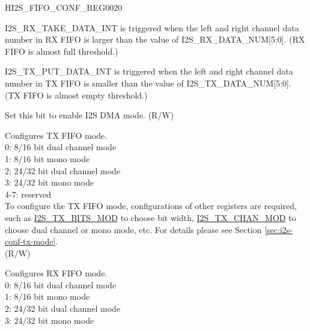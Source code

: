 \begin{register}{H}{I2S\_FIFO\_CONF\_REG}{\hexprefix{}0020}\label{regdesc:I2SFIFOCONFREG}
%
%
%
%
%
%
%
%
\regnewline%
\begin{regdesc}\begin{reglist}
\label{fielddesc:I2SRXDATANUM}\item [I2S\_RX\_DATA\_NUM] I2S\_RX\_TAKE\_DATA\_INT is triggered when the left and right channel data number in RX FIFO is larger than the value of I2S\_RX\_DATA\_NUM[5:0]. (RX FIFO is almost full threshold.)
\label{fielddesc:I2STXDATANUM}\item [I2S\_TX\_DATA\_NUM] I2S\_TX\_PUT\_DATA\_INT is triggered when the left and right channel data number in TX FIFO is smaller than the value of I2S\_TX\_DATA\_NUM[5:0]. (TX FIFO is almost empty threshold.)
\label{fielddesc:I2SDSCREN}\item [I2S\_DSCR\_EN] Set this bit to enable I2S DMA mode. (R/W)
\label{fielddesc:I2STXFIFOMOD}\item [I2S\_TX\_FIFO\_MOD] Configures TX FIFO mode.\\
0: 8/16 bit dual channel mode\\
1: 8/16 bit mono mode\\
2: 24/32 bit dual channel mode\\
3: 24/32 bit mono mode\\
4-7: reserved\\
To configure the TX FIFO mode, configurations of other registers are required, such as \hyperref[fielddesc:I2STXBITSMOD]{I2S\_TX\_BITS\_MOD} to choose bit width, \hyperref[fielddesc:I2STXCHANMOD]{I2S\_TX\_CHAN\_MOD} to choose dual channel or mono mode, etc. For details please see Section \ref{sec:i2s-conf-tx-mode}.\\ 
(R/W)
\label{fielddesc:I2SRXFIFOMOD}\item [I2S\_RX\_FIFO\_MOD] Configures RX FIFO mode.\\
0: 8/16 bit dual channel mode\\
1: 8/16 bit mono mode\\
2: 24/32 bit dual channel mode\\
3: 24/32 bit mono mode\\

\end{reglist}
\end{regdesc}
\end{register}
